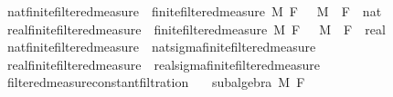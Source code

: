 \begin{isabellebody}
\endisatagproof
{\isafoldproof}%
%
\isadelimproof
\isanewline
%
\endisadelimproof
\isanewline
{}\isamarkupfalse%
\ nat{\isacharunderscore}{\kern0pt}finite{\isacharunderscore}{\kern0pt}filtered{\isacharunderscore}{\kern0pt}measure\ {\isacharequal}{\kern0pt}\ finite{\isacharunderscore}{\kern0pt}filtered{\isacharunderscore}{\kern0pt}measure\ M\ F\ {}\ \ M\ \ F\ {\isacharcolon}{\kern0pt}{\isacharcolon}{\kern0pt}\ {\isachardoublequoteopen}nat\ {\isasymRightarrow}\ {\isacharunderscore}{\kern0pt}{\isachardoublequoteclose}\isanewline
{}\isamarkupfalse%
\ real{\isacharunderscore}{\kern0pt}finite{\isacharunderscore}{\kern0pt}filtered{\isacharunderscore}{\kern0pt}measure\ {\isacharequal}{\kern0pt}\ finite{\isacharunderscore}{\kern0pt}filtered{\isacharunderscore}{\kern0pt}measure\ M\ F\ {}\ \ M\ \ F\ {\isacharcolon}{\kern0pt}{\isacharcolon}{\kern0pt}\ {\isachardoublequoteopen}real\ {\isasymRightarrow}\ {\isacharunderscore}{\kern0pt}{\isachardoublequoteclose}\isanewline
\isanewline
{}\isamarkupfalse%
\ nat{\isacharunderscore}{\kern0pt}finite{\isacharunderscore}{\kern0pt}filtered{\isacharunderscore}{\kern0pt}measure\ {\isasymsubseteq}\ nat{\isacharunderscore}{\kern0pt}sigma{\isacharunderscore}{\kern0pt}finite{\isacharunderscore}{\kern0pt}filtered{\isacharunderscore}{\kern0pt}measure%
\isadelimproof
\ %
\endisadelimproof
%
\isatagproof
\isacommand{{\isachardot}{\kern0pt}{\isachardot}{\kern0pt}}\isamarkupfalse%
%
\endisatagproof
{\isafoldproof}%
%
\isadelimproof
%
\endisadelimproof
\isanewline
{}\isamarkupfalse%
\ real{\isacharunderscore}{\kern0pt}finite{\isacharunderscore}{\kern0pt}filtered{\isacharunderscore}{\kern0pt}measure\ {\isasymsubseteq}\ real{\isacharunderscore}{\kern0pt}sigma{\isacharunderscore}{\kern0pt}finite{\isacharunderscore}{\kern0pt}filtered{\isacharunderscore}{\kern0pt}measure%
\isadelimproof
\ %
\endisadelimproof
%
\isatagproof
\isacommand{{\isachardot}{\kern0pt}{\isachardot}{\kern0pt}}\isamarkupfalse%
%
\endisatagproof
{\isafoldproof}%
%
\isadelimproof
%
\endisadelimproof
%
\isadelimdocument
%
\endisadelimdocument
%
\isatagdocument
%
\isamarkuptrue%
%
\endisatagdocument
{\isafolddocument}%
%
\isadelimdocument
%
\endisadelimdocument
{}\isamarkupfalse%
\ filtered{\isacharunderscore}{\kern0pt}measure{\isacharunderscore}{\kern0pt}constant{\isacharunderscore}{\kern0pt}filtration{\isacharcolon}{\kern0pt}\isanewline
\ \ \ {\isachardoublequoteopen}subalgebra\ M\ F{\isachardoublequoteclose}\isanewline

\end{isabellebody}
